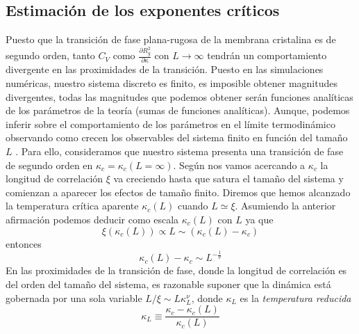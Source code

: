 \subsection{Estimación de los exponentes críticos}

Puesto que la transición de fase plana-rugosa de la membrana cristalina es de
segundo orden, tanto $C_V$ como $\frac{\partial R_g^2}{\partial \kappa}$  con
$L\rightarrow \infty$ tendrán un comportamiento divergente en las proximidades
de la transición. Puesto en las simulaciones numéricas, nuestro sistema
discreto es finito, es imposible obtener magnitudes divergentes, todas las
magnitudes que podemos obtener serán funciones analíticas de los parámetros de
la teoría (sumas de funciones analíticas). Aunque, podemos inferir sobre el
comportamiento de los parámetros en el límite termodinámico observando como
crecen los observables del sistema finito en función del tamaño $L$ \cite{Juan:tesis}. 
Para ello, consideramos que nuestro sistema presenta una transición de fase de
segundo orden en $\kappa_c=\kappa_c(L=\infty)$. Según nos vamos acercando a
$\kappa_c$ la longitud de correlación $\xi$ va creciendo hasta que satura el
tamaño del sistema y comienzan a aparecer los efectos de tamaño
finito. Diremos que hemos alcanzado la temperatura crítica aparente
$\kappa_c(L)$ cuando $L\simeq \xi$. Asumiendo la anterior afirmación podemos
deducir como escala $\kappa_c(L)$ con $L$ ya que
\begin{equation}
\xi(\kappa_c(L))\propto L \sim (\kappa_c(L)-\kappa_c)
\end{equation}
entonces
\begin{equation}
\kappa_c(L)-\kappa_c\sim L^{-\frac{1}{\nu}}
\end{equation}
En las proximidades de la transición de fase, donde la longitud de correlación
es del orden del tamaño del sistema, es razonable suponer que la dinámica está
gobernada por una sola variable $L/\xi\sim L \kappa_L^{\nu}$, donde $\kappa_L$
es la \textit{temperatura reducida}
\begin{equation}
\kappa_L\equiv \frac{\kappa_c-\kappa_c(L)}{\kappa_c(L)}
\end{equation}

